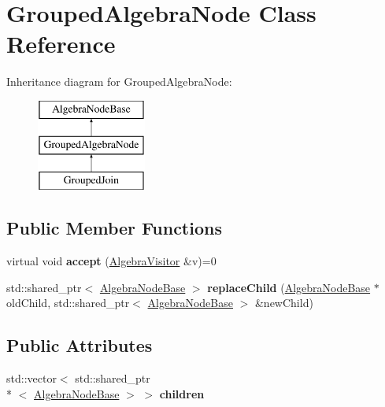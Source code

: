 \hypertarget{class_grouped_algebra_node}{\section{Grouped\+Algebra\+Node Class Reference}
\label{class_grouped_algebra_node}
}
Inheritance diagram for Grouped\+Algebra\+Node\+:\begin{figure}[H]
\begin{center}
\leavevmode
\includegraphics[height=3.000000cm]{class_grouped_algebra_node}
\end{center}
\end{figure}
\subsection*{Public Member Functions}
\begin{DoxyCompactItemize}
\item 
\hypertarget{class_grouped_algebra_node_a60aae470b5aee869eca9a504fdf79f32}{virtual void {\bfseries accept} (\hyperlink{class_algebra_visitor}{Algebra\+Visitor} \&v)=0}\label{class_grouped_algebra_node_a60aae470b5aee869eca9a504fdf79f32}

\item 
\hypertarget{class_grouped_algebra_node_a463e6303f6332fc9ed2a885e3456b58e}{std\+::shared\+\_\+ptr$<$ \hyperlink{class_algebra_node_base}{Algebra\+Node\+Base} $>$ {\bfseries replace\+Child} (\hyperlink{class_algebra_node_base}{Algebra\+Node\+Base} $\ast$old\+Child, std\+::shared\+\_\+ptr$<$ \hyperlink{class_algebra_node_base}{Algebra\+Node\+Base} $>$ \&new\+Child)}\label{class_grouped_algebra_node_a463e6303f6332fc9ed2a885e3456b58e}

\end{DoxyCompactItemize}
\subsection*{Public Attributes}
\begin{DoxyCompactItemize}
\item 
\hypertarget{class_grouped_algebra_node_acabb532765e4d32cec630651bb5d726f}{std\+::vector$<$ std\+::shared\+\_\+ptr\\*
$<$ \hyperlink{class_algebra_node_base}{Algebra\+Node\+Base} $>$ $>$ {\bfseries children}}\label{class_grouped_algebra_node_acabb532765e4d32cec630651bb5d726f}

\end{DoxyCompactItemize}


